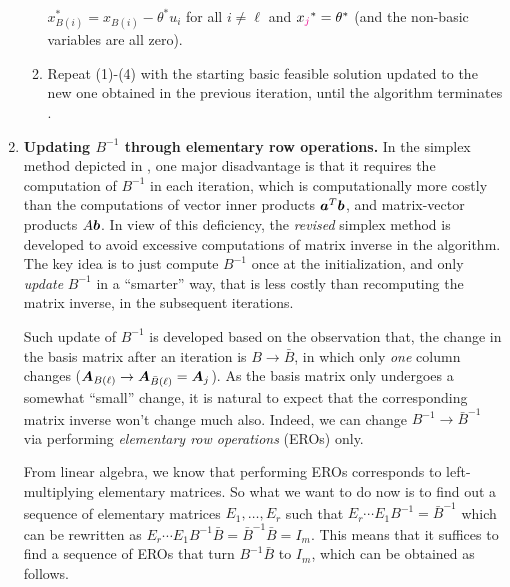 \begin{enumerate}
\begin{enumerate}[label={(\arabic*)}]
\(x_{B(i)}^{*}=x_{B(i)}-\theta^{*}u_i\) for all \(i\ne\ell\) and
\(x_{\color{magenta}j}^{*}=\theta^{*}\) (and the non-basic variables are all zero).
\item Repeat (1)-(4) with the starting basic feasible solution updated to the
new one obtained in the previous iteration, until the algorithm terminates
.
\end{enumerate}
\item \label{it:simplex-update-binv-eros} \textbf{Updating \(B^{-1}\) through
elementary row operations.} In the simplex method depicted in
, one major disadvantage is that it requires
the computation of \(B^{-1}\) in each iteration, which is computationally more
costly than the computations of vector inner products \(\bm{a}^{T}\bm{b}\),
and matrix-vector products \(A\bm{b}\). In view of this deficiency, the
\emph{revised} simplex method is developed to avoid excessive computations of
matrix inverse in the algorithm. The key  idea is to just compute
\(B^{-1}\) once at the initialization, and only \emph{update} \(B^{-1}\) in a
``smarter'' way, that is less costly than recomputing the matrix inverse, in
the subsequent iterations.

Such update of \(B^{-1}\) is developed based on the observation that, the
change in the basis matrix after an iteration is \(B\to\bar{B}\), in which only
\emph{one} column changes (\(\bm{A}_{B(\ell)}\to \bm{A}_{\bar{B}(\ell)}=\bm{A}_j\)).
As the basis matrix only undergoes a somewhat ``small'' change, it is natural
to expect that the corresponding matrix inverse won't change much also. Indeed,
we can change \(B^{-1}\to\bar{B}^{-1}\) via performing \emph{elementary row
operations} (EROs) only.

From linear algebra, we know that performing EROs corresponds to
left-multiplying elementary matrices. So what we want to do now is to find out
a sequence of elementary matrices \(E_1,\dotsc,E_r\) such that \(E_r\dotsb
E_1B^{-1}=\bar{B}^{-1}\) which can be rewritten as \(E_r\dotsb
E_1B^{-1}\bar{B}=\bar{B}^{-1}\bar{B}=I_m\). This means that it suffices to find
a sequence of EROs that turn \(B^{-1}\bar{B}\) to \(I_m\), which can be
obtained as follows.


\end{enumerate}
